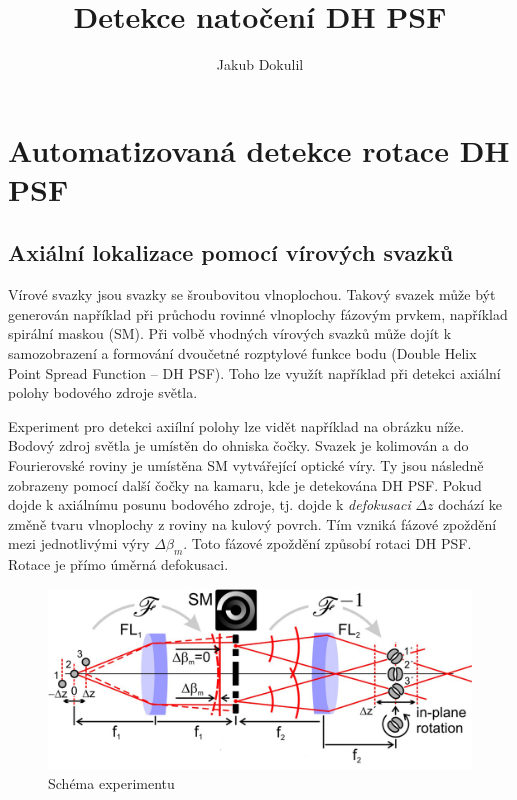 \documentclass[11pt]{article}
\title{Detekce natočení DH PSF}
\author{Jakub Dokulil}
\begin{document}
    
    \maketitle
    
    

    
    \hypertarget{automatizovanuxe1-detekce-rotace-dh-psf}{%
\section{Automatizovaná detekce rotace DH
PSF}\label{automatizovanuxe1-detekce-rotace-dh-psf}}

\hypertarget{axiuxe1lnuxed-lokalizace-pomocuxed-vuxedrovuxfdch-svazkux16f}{%
\subsection{Axiální lokalizace pomocí vírových
svazků}\label{axiuxe1lnuxed-lokalizace-pomocuxed-vuxedrovuxfdch-svazkux16f}}

Vírové svazky jsou svazky se šroubovitou vlnoplochou. Takový svazek může
být generován například při průchodu rovinné vlnoplochy fázovým prvkem,
například spirální maskou (SM). Při volbě vhodných vírových svazků může
dojít k samozobrazení a formování dvoučetné rozptylové funkce bodu
(Double Helix Point Spread Function -- DH PSF). Toho lze využít
například při detekci axiální polohy bodového zdroje světla.

Experiment pro detekci axiílní polohy lze vidět například na obrázku
níže. Bodový zdroj světla je umístěn do ohniska čočky. Svazek je
kolimován a do Fourierovské roviny je umístěna SM vytvářející optické
víry. Ty jsou následně zobrazeny pomocí další čočky na kamaru, kde je
detekována DH PSF. Pokud dojde k axiálnímu posunu bodového zdroje, tj.
dojde k \emph{defokusaci} \(\Delta z\) dochází ke změně tvaru vlnoplochy
z roviny na kulový povrch. Tím vzniká fázové zpoždění mezi jednotlivými
výry \(\Delta \beta_m\). Toto fázové zpoždění způsobí rotaci DH PSF.
Rotace je přímo úměrná defokusaci.

\begin{figure}
\centering
\includegraphics{umisteni_masky.png}
\caption{Schéma experimentu}
\end{figure}
\end{document}
